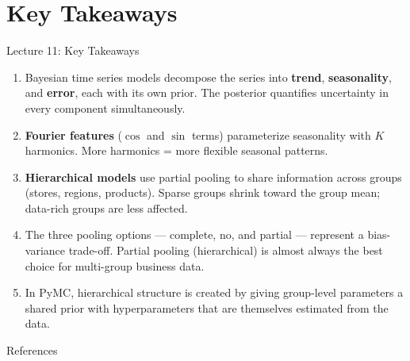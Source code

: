 \documentclass[aspectratio=169, 11pt]{beamer}
\begin{document}
\section{Key Takeaways}


\begin{frame}{Lecture 11: Key Takeaways}
  \begin{keybox}
    {\small
    \begin{enumerate}
      \item Bayesian time series models decompose the series into
            \textbf{trend}, \textbf{seasonality}, and \textbf{error},
            each with its own prior. The posterior quantifies uncertainty
            in every component simultaneously.

      \item \textbf{Fourier features} ($\cos$ and $\sin$ terms) parameterize
            seasonality with $K$ harmonics. More harmonics = more flexible
            seasonal patterns.

      \item \textbf{Hierarchical models} use partial pooling to share
            information across groups (stores, regions, products).
            Sparse groups shrink toward the group mean; data-rich groups
            are less affected.

      \item The three pooling options --- complete, no, and partial ---
            represent a bias-variance trade-off. Partial pooling
            (hierarchical) is almost always the best choice for
            multi-group business data.

      \item In PyMC, hierarchical structure is created by giving
            group-level parameters a shared prior with hyperparameters
            that are themselves estimated from the data.
    \end{enumerate}
    }
  \end{keybox}
\end{frame}

\begin{frame}[allowframebreaks]{References}
  \printbibliography[heading=none]
\end{frame}

\end{document}
